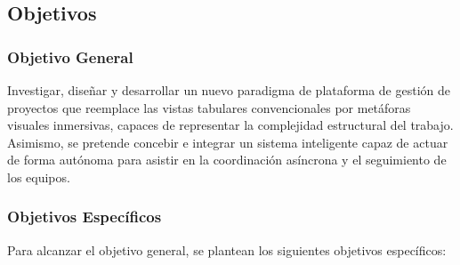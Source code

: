 \subsection{Objetivos}

\subsubsection{Objetivo General}
Investigar, diseñar y desarrollar un nuevo paradigma de plataforma de gestión de proyectos que reemplace las vistas tabulares convencionales por metáforas visuales inmersivas, capaces de representar la complejidad estructural del trabajo. Asimismo, se pretende concebir e integrar un sistema inteligente capaz de actuar de forma autónoma para asistir en la coordinación asíncrona y el seguimiento de los equipos.

\subsubsection{Objetivos Específicos}
Para alcanzar el objetivo general, se plantean los siguientes objetivos específicos:

